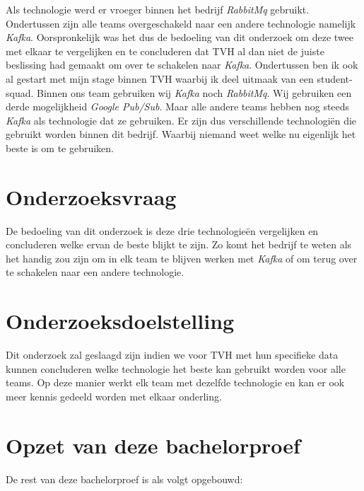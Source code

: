 Als technologie werd er vroeger binnen het bedrijf \emph{RabbitMq} gebruikt. Ondertussen zijn alle teams overgeschakeld naar een andere technologie namelijk \emph{Kafka}. Oorspronkelijk was het dus de bedoeling van dit onderzoek om deze twee met elkaar te vergelijken en te concluderen dat TVH al dan niet de juiste beslissing had gemaakt om over te schakelen naar \emph{Kafka}. Ondertussen ben ik ook al gestart met mijn stage binnen TVH waarbij ik deel uitmaak van een student-squad. Binnen ons team gebruiken wij \emph{Kafka} noch \emph{RabbitMq}. Wij gebruiken een derde mogelijkheid \emph{Google Pub/Sub}. Maar alle andere teams hebben nog steeds \emph{Kafka} als technologie dat ze gebruiken. Er zijn dus verschillende technologiën die gebruikt worden binnen dit bedrijf. Waarbij niemand weet welke nu eigenlijk het beste is om te gebruiken. 

\section{Onderzoeksvraag}
\label{sec:onderzoeksvraag}

De bedoeling van dit onderzoek is deze drie technologieën vergelijken en concluderen welke ervan de beste blijkt te zijn. Zo komt het bedrijf te weten als het handig zou zijn om in elk team te blijven werken met \emph{Kafka} of om terug over te schakelen naar een andere technologie. 

\section{Onderzoeksdoelstelling}
\label{sec:onderzoeksdoelstelling}

Dit onderzoek zal geslaagd zijn indien we voor TVH met hun specifieke data kunnen concluderen welke technologie het beste kan gebruikt worden voor alle teams. Op deze manier werkt elk team met dezelfde technologie en kan er ook meer kennis gedeeld worden met elkaar onderling.

\section{Opzet van deze bachelorproef}
\label{sec:opzet-bachelorproef}


De rest van deze bachelorproef is als volgt opgebouwd:

